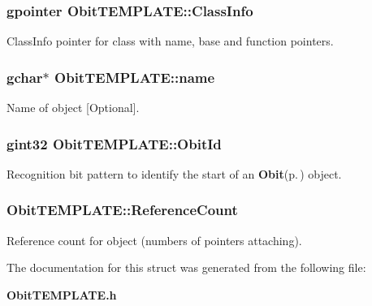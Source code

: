 \subsubsection{\setlength{\rightskip}{0pt plus 5cm}gpointer {\bf Obit\-TEMPLATE::Class\-Info}}\label{structObitTEMPLATE_o1}


Class\-Info pointer for class with name, base and function pointers. 

\subsubsection{\setlength{\rightskip}{0pt plus 5cm}gchar$\ast$ {\bf Obit\-TEMPLATE::name}}\label{structObitTEMPLATE_o3}


Name of object [Optional]. 

\subsubsection{\setlength{\rightskip}{0pt plus 5cm}gint32 {\bf Obit\-TEMPLATE::Obit\-Id}}\label{structObitTEMPLATE_o0}


Recognition bit pattern to identify the start of an {\bf Obit}{\rm (p.\,\pageref{structObit})} object. 

\subsubsection{ {\bf Obit\-TEMPLATE::Reference\-Count}}\label{structObitTEMPLATE_o2}


Reference count for object (numbers of pointers attaching). 



The documentation for this struct was generated from the following file:\begin{CompactItemize}
\item 
{\bf Obit\-TEMPLATE.h}\end{CompactItemize}
